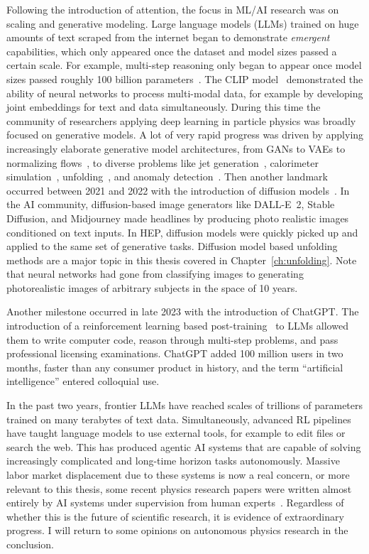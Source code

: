 Following the introduction of attention, the focus in ML/AI research was on scaling and generative modeling.
Large language models (LLMs) trained on huge amounts of text scraped from the internet began to demonstrate \textit{emergent} capabilities, which only appeared once the dataset and model sizes passed a certain scale.
For example, multi-step reasoning only began to appear once model sizes passed roughly 100 billion parameters~\cite{Wei:2022emergent}.
The CLIP model~\cite{Radford:2021clip} demonstrated the ability of neural networks to process multi-modal data, for example by developing joint embeddings for text and data simultaneously.
During this time the community of researchers applying deep learning in particle physics was broadly focused on generative models.
A lot of very rapid progress was driven by applying increasingly elaborate generative model architectures, from GANs to VAEs to normalizing flows~\cite{Durkan:2019nsf}, to diverse problems like jet generation~\cite{Butter:2019cae}, calorimeter simulation~\cite{Paganini:2017hrr}, unfolding~\cite{Datta:2018mwd, Bellagente:2020piv, Howard:2021pos}, and anomaly detection~\cite{Nachman:2020lpy, Hallin:2021wme}.
Then another landmark occurred between 2021 and 2022 with the introduction of diffusion models~\cite{Ho:2020ddpm,Song:2021score}.
In the AI community, diffusion-based image generators like DALL-E~2, Stable Diffusion, and Midjourney made headlines by producing photo realistic images conditioned on text inputs.
In HEP, diffusion models were quickly picked up and applied to the same set of generative tasks.
Diffusion model based unfolding methods are a major topic in this thesis covered in Chapter~\ref{ch:unfolding}.
Note that neural networks had gone from classifying images to generating photorealistic images of arbitrary subjects in the space of 10 years.

Another milestone occurred in late 2023 with the introduction of ChatGPT.
The introduction of a reinforcement learning based post-training~\cite{Ouyang:2022instructgpt} to LLMs allowed them to write computer code, reason through multi-step problems, and pass professional licensing examinations.
ChatGPT added 100 million users in two months, faster than any consumer product in history, and the term ``artificial intelligence'' entered colloquial use.

In the past two years, frontier LLMs have reached scales of trillions of parameters trained on many terabytes of text data.
Simultaneously, advanced RL pipelines have taught language models to use external tools, for example to edit files or search the web.
This has produced agentic AI systems that are capable of solving increasingly complicated and long-time horizon tasks autonomously.
Massive labor market displacement due to these systems is now a real concern, or more relevant to this thesis, some recent physics research papers were written almost entirely by AI systems under supervision from human experts~\cite{Schwartz:2026ekw, Guevara:2026qzd}.
Regardless of whether this is the future of scientific research, it is evidence of extraordinary progress.
I will return to some opinions on autonomous physics research in the conclusion.

